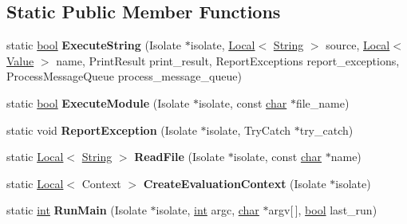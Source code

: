 \subsection*{Static Public Member Functions}
\begin{DoxyCompactItemize}
\item 
\mbox{\label{classv8_1_1Shell_a4182681183bd08826995386f070416bb}} 
static \mbox{\hyperlink{classbool}{bool}} {\bfseries Execute\+String} (Isolate $\ast$isolate, \mbox{\hyperlink{classv8_1_1Local}{Local}}$<$ \mbox{\hyperlink{classv8_1_1String}{String}} $>$ source, \mbox{\hyperlink{classv8_1_1Local}{Local}}$<$ \mbox{\hyperlink{classv8_1_1Value}{Value}} $>$ name, Print\+Result print\+\_\+result, Report\+Exceptions report\+\_\+exceptions, Process\+Message\+Queue process\+\_\+message\+\_\+queue)
\item 
\mbox{\label{classv8_1_1Shell_a1f76c0129b87a9da7d54e060827c025e}} 
static \mbox{\hyperlink{classbool}{bool}} {\bfseries Execute\+Module} (Isolate $\ast$isolate, const \mbox{\hyperlink{classchar}{char}} $\ast$file\+\_\+name)
\item 
\mbox{\label{classv8_1_1Shell_a45ffe976e0fcd45629b6ff5f03e80943}} 
static void {\bfseries Report\+Exception} (Isolate $\ast$isolate, Try\+Catch $\ast$try\+\_\+catch)
\item 
\mbox{\label{classv8_1_1Shell_a7031e2aefd0be84b22df14c3e0abedcc}} 
static \mbox{\hyperlink{classv8_1_1Local}{Local}}$<$ \mbox{\hyperlink{classv8_1_1String}{String}} $>$ {\bfseries Read\+File} (Isolate $\ast$isolate, const \mbox{\hyperlink{classchar}{char}} $\ast$name)
\item 
\mbox{\label{classv8_1_1Shell_a7e4313b0046d027e73a03e6665821493}} 
static \mbox{\hyperlink{classv8_1_1Local}{Local}}$<$ Context $>$ {\bfseries Create\+Evaluation\+Context} (Isolate $\ast$isolate)
\item 
\mbox{\label{classv8_1_1Shell_ad869dfefa18309958f1bcc4f86cc8a2a}} 
static \mbox{\hyperlink{classint}{int}} {\bfseries Run\+Main} (Isolate $\ast$isolate, \mbox{\hyperlink{classint}{int}} argc, \mbox{\hyperlink{classchar}{char}} $\ast$argv\mbox{[}$\,$\mbox{]}, \mbox{\hyperlink{classbool}{bool}} last\+\_\+run)
\item 

\end{DoxyCompactItemize}
